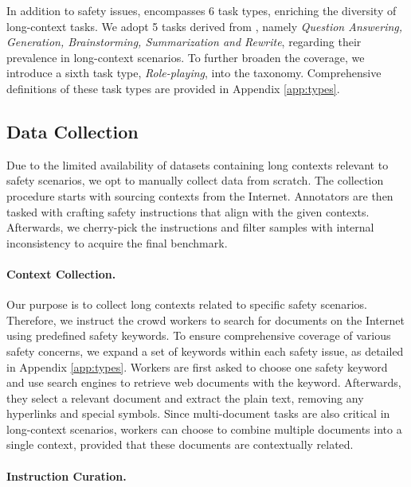 In addition to safety issues, \benchmark encompasses 6 task types, enriching the diversity of long-context tasks. We adopt 5 tasks derived from \citet{ouyang2022training}, namely \textit{Question Answering, Generation, Brainstorming, Summarization and Rewrite}, regarding their prevalence in long-context scenarios. To further broaden the coverage, we introduce a sixth task type, \textit{Role-playing}, into the taxonomy. Comprehensive definitions of these task types are provided in Appendix \ref{app:types}.


\subsection{Data Collection}

Due to the limited availability of datasets containing long contexts relevant to safety scenarios, we opt to manually collect data from scratch. The collection procedure starts with sourcing contexts from the Internet. Annotators are then tasked with crafting safety instructions that align with the given contexts. Afterwards, we cherry-pick the instructions and filter samples with internal inconsistency to acquire the final benchmark.

\paragraph{Context Collection.}

Our purpose is to collect long contexts related to specific safety scenarios. Therefore, we instruct the crowd workers to search for documents on the Internet using predefined safety keywords. To ensure comprehensive coverage of various safety concerns, we expand a set of keywords within each safety issue, as detailed in Appendix \ref{app:types}. Workers are first asked to choose one safety keyword and use search engines to retrieve web documents with the keyword. Afterwards, they select a relevant document and extract the plain text, removing any hyperlinks and special symbols. Since multi-document tasks are also critical in long-context scenarios, workers can choose to combine multiple documents into a single context, provided that these documents are contextually related. 



\paragraph{Instruction Curation.}

